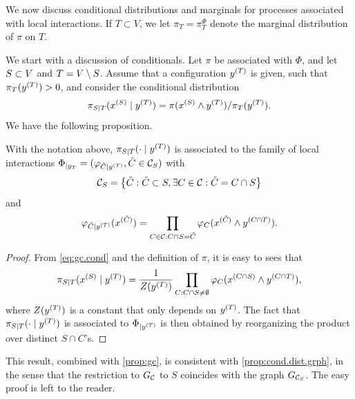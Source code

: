 We now discuss conditional distributions and marginals for processes
associated with local interactions. If $T\subset V$, we let $\pi_T = \pi_T^\Phi$ denote the marginal distribution of $\pi$ on $T$.

We start with a discussion of conditionals. Let
$\pi$ be associated with $\Phi$, and let
$S\subset V$ and $T = V\setminus S$. Assume that a configuration $y^{(T)}$ is
given, such that $\pi_T(y^{(T)}) >0$, and consider the conditional
distribution
\begin{equation}
\label{eq:gc.cond}
\pi_{S\mid T}(x^{(S)}\mid y^{(T)}) = \pi(x^{(S)}\wedge y^{(T)})/\pi_T(y^{(T)}).
\end{equation}
 We have the following proposition.
\begin{proposition}
\label{prop:gc.cond}
With the notation above, $\pi_{S\mid T}(\cdot\mid y^{(T)})$ is associated to the
family of local interactions $\Phi_{|y_T} = (\varphi_{\tilde C\mid y^{(T)}},
\tilde C\in
{\mathcal C}_S)$ with
\[
{\mathcal C}_S = \left\{ \tilde C: \tilde C\subset S, \exists C\in{\mathcal C}: \tilde C =
  C\cap S \right\}
\]
and
\[
\varphi_{\tilde C \mid y^{(T)}}(x^{(\tilde C)}) = \prod_{C\in {\mathcal C}:C\cap S = \tilde C}
\varphi_C(x^{(\tilde C)}\wedge y^{(C\cap T)}).
\]
\end{proposition}
\begin{proof}
From \cref{eq:gc.cond} and the definition of $\pi$, it is easy to sees that
\[
\pi_{S\mid T}(x^{(S)}\mid y^{(T)}) = \frac{1}{Z(y^{(T)})} \prod_{C:C\cap S\neq \emptyset}
\varphi_C(x^{(C\cap S)} \wedge y^{(C\cap T)}),
\]
where $Z(y^{(T)})$ is a constant that only depends on $y^{(T)}$. The fact that
$\pi_{S\mid T}(\cdot \mid y^{(T)})$ is associated to $\Phi_{|y^{(T)}}$ is then
obtained by reorganizing the product over distinct $S\cap C$'s.
\end{proof}

This result, combined with
 \cref{prop:gc}, is consistent with 
\cref{prop:cond.dist.grph}, in the sense that the restriction to
$G_{\mathcal C}$ to $S$ coincides with the graph $G_{{\mathcal C}_S}$. The easy proof is
left to the reader.

